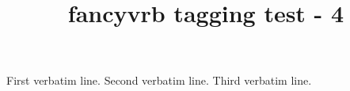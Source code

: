 \documentclass{article}
\title{fancyvrb tagging test - 4}
\begin{document}
\begin{CenterExample}
First verbatim line.
Second verbatim line.
Third verbatim line.
\end{CenterExample}
\end{document}

